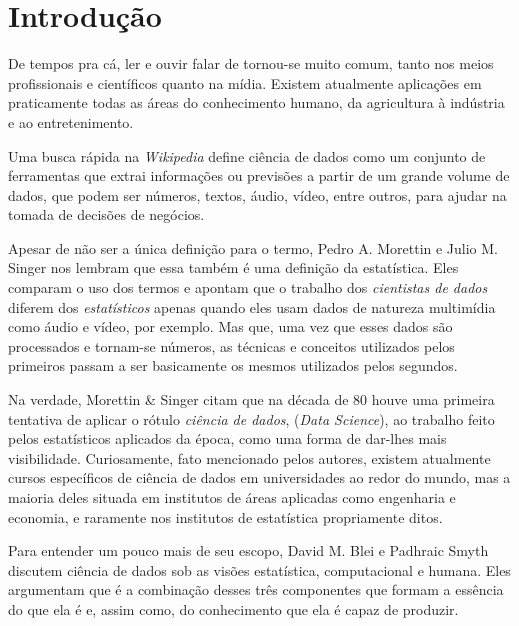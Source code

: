 
\chapter{Introdução}
\label{cap:introducao}


De tempos pra cá, ler e ouvir falar de  tornou-se muito comum, tanto nos meios profissionais e científicos quanto na mídia. Existem atualmente aplicações em praticamente todas as áreas do conhecimento humano, da agricultura à indústria e ao entretenimento.

Uma busca rápida na \emph{Wikipedia} \citep{wiki} define ciência de dados como um conjunto de ferramentas que extrai informações ou previsões a partir de um grande volume de dados, que podem ser números, textos, áudio, vídeo, entre outros, para ajudar na tomada de decisões de negócios.

Apesar de não ser a única definição para o termo, Pedro A. Morettin e Julio M. Singer \citep{apostila} nos lembram que essa também é uma definição da estatística. Eles comparam o uso dos termos e apontam que o trabalho dos \emph{cientistas de dados} diferem dos \emph{estatísticos} apenas quando eles usam dados de natureza multimídia como áudio e vídeo, por exemplo. Mas que, uma vez que esses dados são processados e tornam-se números, as técnicas e conceitos utilizados pelos primeiros passam a ser basicamente os mesmos utilizados pelos segundos.

Na verdade, Morettin \& Singer \citep{apostila} citam que na década de 80 houve uma primeira tentativa de aplicar o rótulo \emph{ciência de dados}, (\emph{Data Science}), ao trabalho feito pelos estatísticos aplicados da época, como uma forma de dar-lhes mais visibilidade. Curiosamente, fato mencionado pelos autores, existem atualmente cursos específicos de ciência de dados em universidades ao redor do mundo, mas a maioria deles situada em institutos de áreas aplicadas como engenharia e economia, e raramente nos institutos de estatística propriamente ditos.

Para entender um pouco mais de seu escopo, David M. Blei e Padhraic Smyth \citep{blei} discutem ciência de dados sob as visões estatística, computacional e humana. Eles argumentam que é a combinação desses três componentes que formam a essência do que ela é e, assim como, do conhecimento que ela é capaz de produzir.

